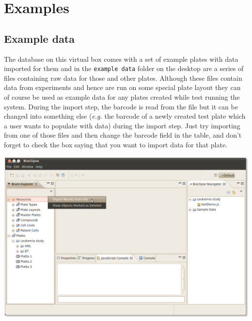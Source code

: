 \documentclass[12pt, a4paper, twoside, openany]{article}
\begin{document}
    \newpage

    \section{Examples}

    \subsection*{Example data}
    The database on this virtual box comes with a set of example plates with
    data imported for them and in the \texttt{example data} folder on the
    desktop are a series of files containing raw data for those and other
    plates. Although these files contain data from experiments and hence are
    run on some special plate layout they can of course be used as example data
    for any plates created while test running the system. During the import
    step, the barcode is read from the file but it can be changed into
    something else (\textit{e.g.} the barcode of a newly created test plate
    which a user wants to populate with data) during the import step. Just try
    importing from one of those files and then change the barcode field in the
    table, and don't forget to check the box saying that you want to import
    data for that plate.

    \begin{center}
        \includegraphics[scale=1.2]{images/import.png}
    \end{center}
\end{document}

